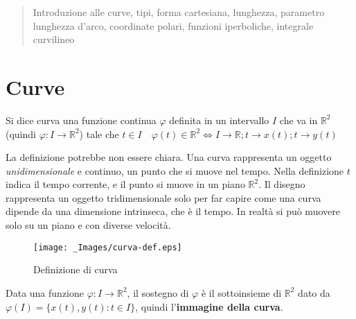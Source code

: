 \def \varTitle {Curve in R2}
\def \varAuthors {Mc128k}
\def \varSubject {}
\def \varKeywords {}
\def \varCopyright {\textcopyright \  \the\year \  Mc128k}
\def \varDate {2015-09-01}
\def \varAbstractTitle {Contenuti}
\def \varAbstractContents {Introduzione alle curve, tipi, forma cartesiana, lunghezza, parametro lunghezza d'arco, coordinate polari, funzioni iperboliche, integrale curvilineo}
\def \varPaperType {a4paper}
\def \varImagesPath {./_Images/}



  \maketitle \renewcommand{\abstractname}{\varAbstractTitle} \begin{abstract} \varAbstractContents \end{abstract} \tableofcontents \pagebreak \graphicspath{{\varImagesPath}}

\section{Curve}
\begin{definition}[Curva]
Si dice curva una funzione continua $\varphi$ definita in un intervallo $I$ che va in $\mathbb{R}^2$ (quindi $\varphi : I \rightarrow \mathbb{R}^2$) tale che $t\in I\quad \varphi(t)\in \mathbb{R}^2 \Longleftrightarrow I\rightarrow \mathbb{R} ; t\rightarrow x(t); t\rightarrow y(t)$
\end{definition}

La definizione potrebbe non essere chiara. Una curva rappresenta un oggetto {\em unidimensionale} e continuo, un punto che si muove nel tempo. Nella definizione $t$ indica il tempo corrente, e il punto si muove in un piano $\mathbb{R}^2$. Il disegno rappresenta un oggetto tridimensionale solo per far capire come una curva dipende da una dimensione intrinseca, che è il tempo. In realtà si può muovere solo su un piano e con diverse velocità.
\begin{figure}[h]
	\texttt{[image: \_Images/curva-def.eps]}
	\centering
	\caption{Definizione di curva}
\end{figure}

\begin{definition}
Data una funzione $\varphi : I \rightarrow \mathbb{R}^2$, il sostegno di $\varphi$ è il sottoinsieme di $\mathbb{R}^2$ dato da $\varphi(I)=\{x(t), y(t) : t\in I\}$, quindi l'\textbf{immagine della curva}.
\end{definition}

